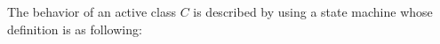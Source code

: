 The behavior of an active class $C$ is described by using a state machine whose definition is as following:	

